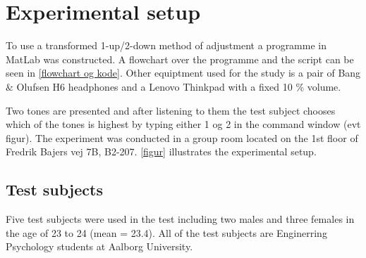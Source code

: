 \section*{Experimental setup}
To use a transformed 1-up/2-down method of adjustment a programme in MatLab was constructed. A flowchart over the programme and the script can be seen in \autoref{flowchart og kode}. Other equiptment used for the study is a pair of Bang $\&$ Olufsen H6 headphones and a Lenovo Thinkpad with a fixed 10 \% volume.

Two tones are presented and after listening to them the test subject chooses which of the tones is highest by typing either 1 og 2 in the command window (evt figur). The experiment was conducted in a group room located on the 1st floor of Fredrik Bajers vej 7B, B2-207. \autoref{figur} illustrates the experimental setup. 

\subsection*{Test subjects}
Five test subjects were used in the test including two males and three females in the age of 23 to 24 (mean = 23.4). All of the test subjects are Enginerring Psychology students at Aalborg University. 